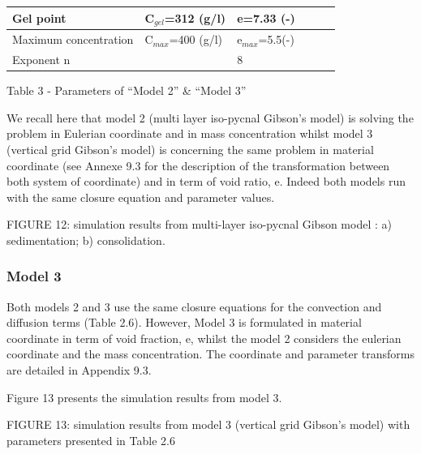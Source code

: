 \begin{tabular}{llllll}
\multicolumn{1}{p{0.047in}|}{\raggedright Gel point} & 
\multicolumn{1}{p{0.047in}|}{\centering C$_{gel}$=312 (g/l)} & 
\multicolumn{1}{p{0.047in}|}{\raggedright e=7.33 (-)} &  &  &  \\ \hline
\multicolumn{1}{|p{0.819in}|}{\raggedright Maximum concentration} & 
\multicolumn{1}{p{1.665in}|}{\centering C$_{max}$=400 (g/l)} & 
\multicolumn{4}{p{2.016in}|}{\raggedright e$_{max}$=5.5(-)} \\ \hline
\multicolumn{1}{p{0.047in}|}{\raggedright Exponent n} & 
\multicolumn{1}{p{0.047in}|}{\centering 8} & \multicolumn{1}{p{0.047in}|}{%
\raggedright 8} &  &  &  \\ \hline
\end{tabular}

Table 3 - Parameters of ``Model 2'' \& ``Model 3''

We recall here that model 2 (multi layer iso-pycnal Gibson's model) is
solving the problem in Eulerian coordinate and in mass concentration whilst
model 3 (vertical grid Gibson's model) is concerning the same problem in
material coordinate (see Annexe 9.3 for the description of the
transformation between both system of coordinate) and in term of void ratio,
e. Indeed both models run with the same closure equation and parameter
values.\newline

FIGURE
12: simulation results from multi-layer iso-pycnal Gibson model : a)
sedimentation; b) consolidation.

\subsubsection*{Model 3}

Both models 2 and 3 use the same closure equations for the convection and
diffusion terms (Table 2.6). However, Model 3 is formulated in material
coordinate in term of void fraction, e, whilst the model 2 considers the
eulerian coordinate and the mass concentration. The coordinate and parameter
transforms are detailed in Appendix 9.3.

Figure 13 presents the simulation results from model 3.\newline

FIGURE 13:
simulation results from model 3 (vertical grid Gibson's model) with
parameters presented in Table 2.6



